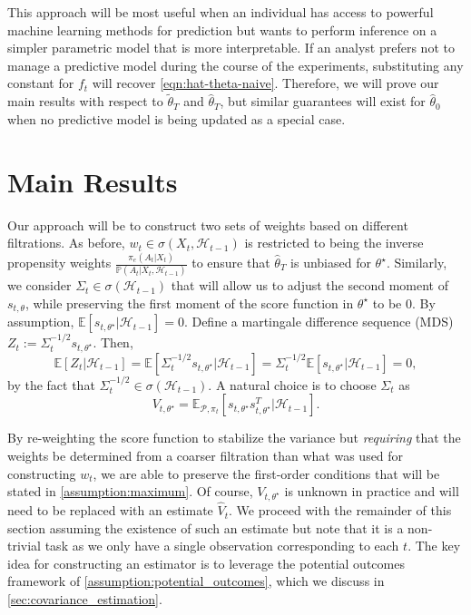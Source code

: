 \documentclass[11pt]{article}
\newcommand{\E}{\mathbb{E}}
\begin{document}
This approach will be most useful when an individual has access to powerful machine learning methods for prediction but wants to perform inference on a simpler parametric model that is more interpretable. If an analyst prefers not to manage a predictive model during the course of the experiments, substituting any constant for $f_{t}$ will recover \cref{eqn:hat-theta-naive}. Therefore, we will prove our main results with respect to $\tilde{\theta}_{T}$ and $\hat{\theta}_{T}$, but similar guarantees will exist for $\hat{\theta}_{0}$ when no predictive model is being updated as a special case.  

\section{Main Results} \label{sec:results}
Our approach will be to construct two sets of weights based on different filtrations. As before, $w_{t} \in \sigma(X_{t},\mathcal{H}_{t-1})$ is restricted to being the inverse propensity weights $\frac{\pi_{e}(A_{t} | X_{t})}{ \mathbb{P} (A_{t}  | X_{t}, \mathcal{H}_{t-1}) }$ to ensure that $\hat{\theta}_{T}$ is unbiased for $\theta^{\star}$. Similarly, we consider $\Sigma_{t} \in \sigma(\mathcal{H}_{t-1})$ that will allow us to adjust the second moment of $s_{t,\theta}$, while preserving the first moment of the score function in $\theta^{\star}$ to be $0$. By assumption, $\E\left[s_{t,\theta^{\star}}|\mathcal{H}_{t-1}\right] =0$. Define a martingale difference sequence (MDS) $Z_{t} := \Sigma_{t}^{-1/2} s_{t,\theta^{\star}}$. Then,
$$\E[Z_{t} | \mathcal{H}_{t-1}] = \E[\Sigma_{t}^{-1/2} s_{t,\theta^{\star}}| \mathcal{H}_{t-1}] =\Sigma_{t}^{-1/2}\E[s_{t,\theta^{\star}}| \mathcal{H}_{t-1}] = 0,$$
by the fact that $\Sigma_{t}^{-1/2}\in \sigma(\mathcal{H}_{t-1})$. A natural choice is to choose $\Sigma_{t}$ as 
$$ V_{t,\theta^{\star}} = \mathbb{E}_{\mathcal{P},\pi_{t}}\left[ s_{t,\theta^{\star}}s_{t,\theta^{\star}}^{T} |\mathcal{H}_{t-1}\right].$$ 

By re-weighting the score function to stabilize the variance but \emph{requiring} that the weights be determined from a coarser filtration than what was used for constructing $w_{t}$, we are able to preserve the first-order conditions that will be stated in \cref{assumption:maximum}. Of course,  $V_{t,\theta^{\star}}$ is unknown in practice and will need to be replaced with an estimate $\hat{V}_{t}$. We proceed with the remainder of this section assuming the existence of such an estimate but note that it is a non-trivial task as we only have a single observation corresponding to each $t$. The key idea for constructing an estimator is to leverage the potential outcomes framework of \cref{assumption:potential_outcomes}, which we discuss in \cref{sec:covariance_estimation}. 
\end{document}
